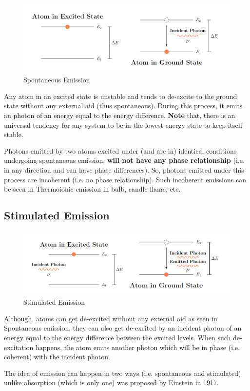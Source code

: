 \documentclass[12pt]{article}
\begin{document}
\begin{figure}[hbp]
    \centering
    \includegraphics[scale=0.5]{./img/04_spontaneous_emission.png}
    \caption{Spontaneous Emission}
\end{figure}

Any atom in an excited state is unstable and tends to de-excite to the ground state without any external aid (thus spontaneous). During this process, it emits an photon of an energy equal to the energy difference. \textbf{Note} that, there is an universal tendency for any system to be in the lowest energy state to keep itself stable.

Photons emitted by two atoms excited under (and are in) identical conditions undergoing spontaneous emission, \textbf{will not have any phase relationship} (i.e. in any direction and can have phase differences). So, photons emitted under this process are incoherent (i.e. no phase relationship). Such incoherent emissions can be seen in Thermoionic emission in bulb, candle flame, etc.

\subsection{Stimulated Emission}

\begin{figure}[hbp]
    \centering
    \includegraphics[scale=0.5]{./img/05_stimulated_emission.png}
    \caption{Stimulated Emission}
\end{figure}

Although, atoms can get de-excited without any external aid as seen in Spontaneous emission, they can also get de-excited by an incident photon of an energy equal to the energy difference between the excited levels. When such de-excitation happens, the atom emits another photon which will be in phase (i.e. coherent) with the incident photon.

The idea of emission can happen in two ways (i.e. spontaneous and stimulated) unlike absorption (which is only one) was proposed by Einstein in 1917.
\end{document}
